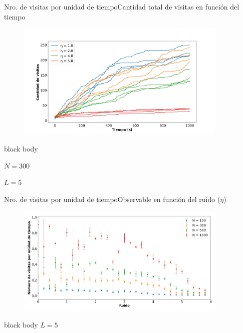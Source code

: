 \documentclass{beamer}
\begin{document}
            \begin{frame}{Nro. de visitas por unidad de tiempo}{Cantidad total de visitas en función del tiempo}
                \begin{figure}[H!]
                    \includegraphics[width=0.9\textwidth]{./visits_vs_time_obc-n300}
                    \label{fig:obc_2}
                \end{figure}
                \begin{beamercolorbox}[sep=5pt,center]{block body}
                    \begin{minipage}[t]{0.45\textwidth}
                        \centering
                        \small{$N=300$}
                    \end{minipage}
                    \hfill
                    \begin{minipage}[t]{0.45\textwidth}
                        \centering
                        \small{$L=5$}
                    \end{minipage}
                \end{beamercolorbox}
            \end{frame}

            \begin{frame}{Nro. de visitas por unidad de tiempo}{Observable en función del ruido ($\eta$)}
                \begin{figure}[H!]
                    \includegraphics[width=0.9\textwidth]{./slope_vs_eta-obc}
                    \label{fig:obc_3}
                \end{figure}
                \begin{beamercolorbox}[sep=5pt,center]{block body}
                    \small{$L=5$}
                \end{beamercolorbox}
            \end{frame}
\end{document}

